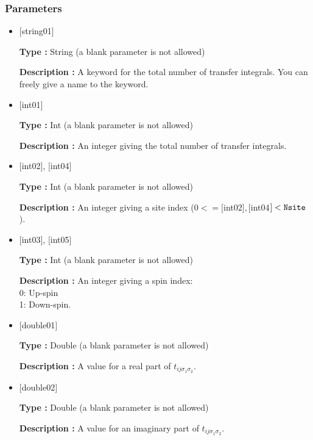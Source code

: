 \subsubsection{Parameters}
 \begin{itemize}

   \item  $[$string01$]$
   
    {\bf Type :} String (a blank parameter is not allowed)

   {\bf Description :} A keyword for the total number of transfer integrals. You can freely give a name to the keyword.

   \item  $[$int01$]$
   
    {\bf Type :} Int (a blank parameter is not allowed)

   {\bf Description :} An integer giving the total number of transfer integrals.

  \item  $[$int02$]$, $[$int04$]$

 {\bf Type :} Int (a blank parameter is not allowed)

{\bf Description :} An integer giving a site index ($0<= [$int02$],  [$int04$]<\verb|Nsite|$).

  \item  $[$int03$]$, $[$int05$]$

 {\bf Type :} Int (a blank parameter is not allowed)

{\bf Description :} An integer giving a spin index:\\
0: Up-spin\\
1: Down-spin.

 \item  $[$double01$]$
   
   {\bf Type :} Double (a blank parameter is not allowed)

  {\bf Description :}  A value for a real part of $t_{ij\sigma_1\sigma_2}$.

 \item  $[$double02$]$
   
   {\bf Type :} Double (a blank parameter is not allowed)

  {\bf Description :} A value for an imaginary part of $t_{ij\sigma_1\sigma_2}$.
\end{itemize}

